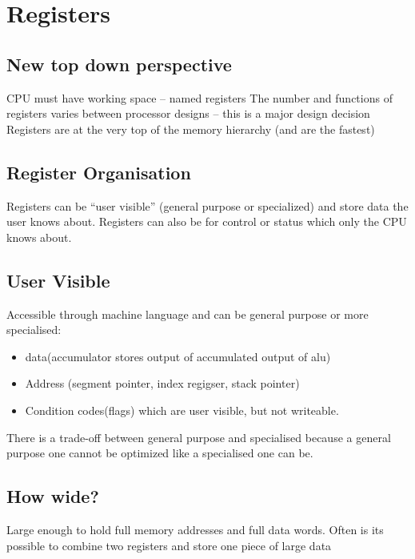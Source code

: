 \section{Registers}\label{sec:registers}

\subsection{New top down perspective}\label{sub:new_top_down_perspective}

CPU must have working space -- named registers
The number and functions of registers varies between processor designs -- this is a major design decision
Registers are at the very top of the memory hierarchy (and are the fastest)

\subsection{Register Organisation}\label{sub:register_organisation}

Registers can be ``user visible'' (general purpose or specialized) and store data the user knows about.
Registers can also be for control or status which only the CPU knows about.

\subsection{User Visible}\label{sub:user_visible}

Accessible through machine language and can be general purpose or more specialised:
\begin{itemize}
	\item data(accumulator stores output of accumulated output of alu)
	\item Address (segment pointer, index regigser, stack pointer)
	\item Condition codes(flags) which are user visible, but not writeable.
\end{itemize}
There is a trade-off between general purpose and specialised because a general purpose one cannot be optimized like a specialised one can be.

\subsection{How wide?}\label{sub:how_wide_}

Large enough to hold full memory addresses and full data words.
Often is its possible to combine two registers and store one piece of large data

